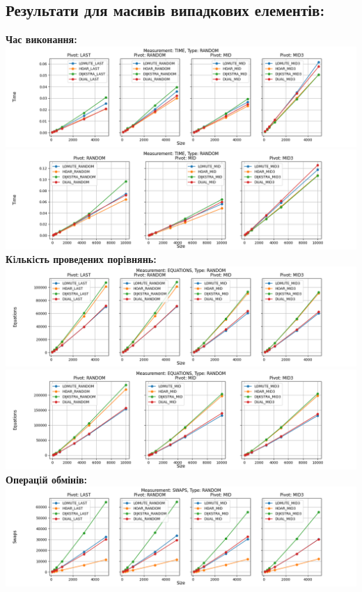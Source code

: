 \documentclass{article}
\begin{document}
    \subsection{Результати для масивів випадкових елементів:}
    \textbf{Час виконання:}
    \newline
        \includegraphics[scale=0.5]{random_Time_6_numbers.png}
        \includegraphics[scale=0.5]{random_Time_3_pivots_7_numbers.png}
    \textbf{Кiлькiсть проведених порiвнянь:}
    \newline
        \includegraphics[scale=0.5]{random_Equations_6_numbers.png}
        \includegraphics[scale=0.5]{random_Equations_3_pivots_7_numbers.png}
        \newline
    \textbf{Операцiй обмінів:}
    \newline
        \includegraphics[scale=0.5]{random_Swaps_6_numbers.png}
\end{document}
